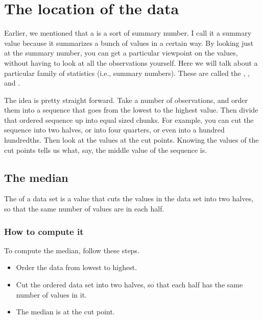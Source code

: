 \documentclass[../../../main.tex]{subfiles}
\begin{document}
\chapter{The location of the data}

Earlier, we mentioned that a  is a sort of summary number. I call it a summary value because it summarizes a bunch of values in a certain way. By looking just at the summary number, you can get a particular viewpoint on the values, without having to look at all the observations yourself. Here we will talk about a particular family of statistics (i.e., summary numbers). These are called the , , and .

The idea is pretty straight forward. Take a number of observations, and order them into a sequence that goes from the lowest to the highest value. Then divide that ordered sequence up into equal sized chunks. For example, you can cut the sequence into two halves, or into four quarters, or even into a hundred hundredths. Then look at the values at the cut points. Knowing the values of the cut points tells us what, say, the middle value of the sequence is. 


\section{The median}

The  of a data set is a value that cuts the values in the data set into two halves, so that the same number of values are in each half.


\subsection{How to compute it}

To compute the median, follow these steps.

\begin{itemize}
  \item Order the data from lowest to highest.
  \item Cut the ordered data set into two halves, so that each half has the same number of values in it.
  \item The median is at the cut point.
\end{itemize}
\end{document}
